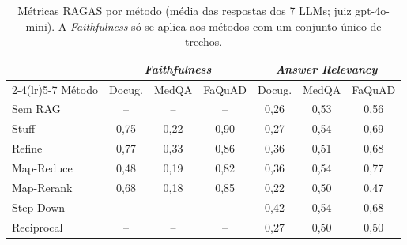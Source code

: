 \begin{table}[!t]
\centering
\footnotesize
\setlength{\tabcolsep}{2.4pt}
\caption{Métricas RAGAS por método (média das respostas dos 7 LLMs; juiz gpt-4o-mini). A \emph{Faithfulness} só se aplica aos métodos com um conjunto único de trechos.}
\label{tab:ragas}
\begin{tabular}{lcccccc}
\toprule
 & \multicolumn{3}{c}{\emph{Faithfulness}} & \multicolumn{3}{c}{\emph{Answer Relevancy}} \\
\cmidrule(lr){2-4}\cmidrule(lr){5-7}
Método & Docug. & MedQA & FaQuAD & Docug. & MedQA & FaQuAD \\
\midrule
Sem RAG & -- & -- & -- & 0,26 & 0,53 & 0,56 \\
Stuff & 0,75 & 0,22 & 0,90 & 0,27 & 0,54 & 0,69 \\
Refine & 0,77 & 0,33 & 0,86 & 0,36 & 0,51 & 0,68 \\
Map-Reduce & 0,48 & 0,19 & 0,82 & 0,36 & 0,54 & 0,77 \\
Map-Rerank & 0,68 & 0,18 & 0,85 & 0,22 & 0,50 & 0,47 \\
Step-Down & -- & -- & -- & 0,42 & 0,54 & 0,68 \\
Reciprocal & -- & -- & -- & 0,27 & 0,50 & 0,50 \\
\bottomrule
\end{tabular}
\end{table}
